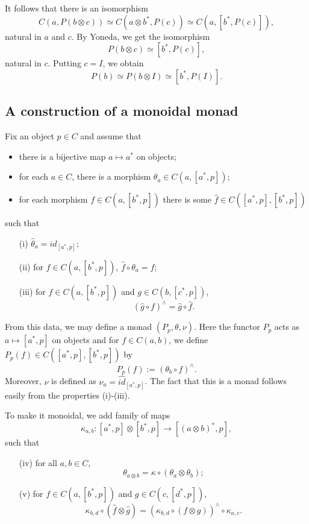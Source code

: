 \documentclass[12pt]{article}
\theoremstyle{definition}
\theoremstyle{remark}
\begin{document}
\medskip
It follows that there is an isomorphism 
\[
C(a,P(b\otimes c))\simeq C(a\otimes b^*, P(c))\simeq C(a,[b^*,P(c)]),
\]
natural in $a$ and $c$. By Yoneda, we get the isomorphism
\[
P(b\otimes c)\simeq [b^*,P(c)],
\]
natural in $c$. Putting $c=I$, we obtain
\[
P(b)\simeq P(b\otimes I)\simeq [b^*,P(I)].
\]

\subsection{A construction of a monoidal monad}

Fix an object  $p\in C$ and assume that 
\begin{itemize}
\item there is a bijective map $a\mapsto a^*$ on objects;
\item for each $a\in C$, there is a morphism $\theta_a\in C(a,[a^*,p])$;
\item for each morphism $f\in C(a,[b^*,p])$ there is some $\hat f\in C([a^*,p],[b^*,p])$
\end{itemize}
such that 
\begin{enumerate}
\item[(i)] $\hat \theta_a=id_{[a^*,p]}$;
\item[(ii)] for $f\in C(a,[b^*,p])$, 
$\hat f\circ \theta_a=f$;
\item[(iii)] for $f\in C(a,[b^*,p])$ and $g\in C(b,[c^*,p])$,
\begin{equation}\label{eq:hatf}
(\hat g\circ f)^{\wedge}=\hat g\circ \hat f.
\end{equation}

\end{enumerate}


From this data, we may define a monad $(P_p,\theta,\nu)$. Here the functor $P_p$ acts as $a\mapsto [a^*,p]$ on objects and 
for $f\in C(a,b)$, we define $P_p(f)\in C([a^*,p],[b^*,p])$ by
\[
P_p(f):=(\theta_b\circ f)^{\wedge}.
\]
Moreover, $\nu$ is defined as $\nu_a=\hat{id}_{[a^*,p]}$. The fact that this is a monad 
 follows easily from the properties (i)-(iii). 

To make it monoidal, we add  family of maps 
\[
\kappa_{a,b}:[a^*,p]\otimes [b^*,p]\to [(a\otimes b)^*,p],
\]
such that
\begin{enumerate}
\item[(iv)] for all $a,b\in C$, 
\[
\theta_{a\otimes b}=\kappa\circ (\theta_a\otimes \theta_b);
\]
\item[(v)] for $f\in C(a,[b^*,p])$ and $g\in C(c,[d^*,p])$,
\[
\kappa_{b,d}\circ(\hat f\otimes \hat g)=(\kappa_{b,d}\circ(f\otimes g))^\wedge\circ
\kappa_{a,c}.
\]

\end{enumerate}
\end{document}
